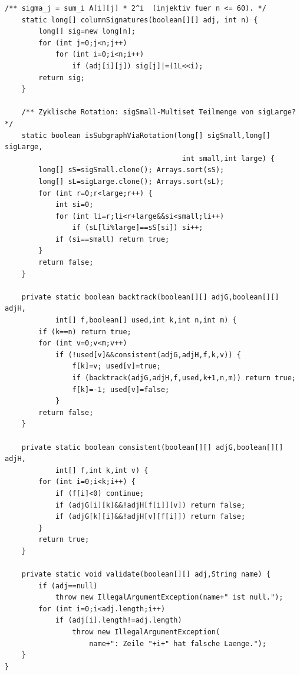 ﻿\documentclass[a4paper,12pt]{article}
\theoremstyle{definition}
\begin{document}
\begin{lstlisting}[style=javastyle,
    caption={SubgraphAlgorithm.java -- Kern-SI-Implementierung nach Epp (2026)}]
    /** sigma_j = sum_i A[i][j] * 2^i  (injektiv fuer n <= 60). */
    static long[] columnSignatures(boolean[][] adj, int n) {
        long[] sig=new long[n];
        for (int j=0;j<n;j++)
            for (int i=0;i<n;i++)
                if (adj[i][j]) sig[j]|=(1L<<i);
        return sig;
    }

    /** Zyklische Rotation: sigSmall-Multiset Teilmenge von sigLarge? */
    static boolean isSubgraphViaRotation(long[] sigSmall,long[] sigLarge,
                                          int small,int large) {
        long[] sS=sigSmall.clone(); Arrays.sort(sS);
        long[] sL=sigLarge.clone(); Arrays.sort(sL);
        for (int r=0;r<large;r++) {
            int si=0;
            for (int li=r;li<r+large&&si<small;li++)
                if (sL[li%large]==sS[si]) si++;
            if (si==small) return true;
        }
        return false;
    }

    private static boolean backtrack(boolean[][] adjG,boolean[][] adjH,
            int[] f,boolean[] used,int k,int n,int m) {
        if (k==n) return true;
        for (int v=0;v<m;v++)
            if (!used[v]&&consistent(adjG,adjH,f,k,v)) {
                f[k]=v; used[v]=true;
                if (backtrack(adjG,adjH,f,used,k+1,n,m)) return true;
                f[k]=-1; used[v]=false;
            }
        return false;
    }

    private static boolean consistent(boolean[][] adjG,boolean[][] adjH,
            int[] f,int k,int v) {
        for (int i=0;i<k;i++) {
            if (f[i]<0) continue;
            if (adjG[i][k]&&!adjH[f[i]][v]) return false;
            if (adjG[k][i]&&!adjH[v][f[i]]) return false;
        }
        return true;
    }

    private static void validate(boolean[][] adj,String name) {
        if (adj==null)
            throw new IllegalArgumentException(name+" ist null.");
        for (int i=0;i<adj.length;i++)
            if (adj[i].length!=adj.length)
                throw new IllegalArgumentException(
                    name+": Zeile "+i+" hat falsche Laenge.");
    }
}
\end{lstlisting}
\end{document}
